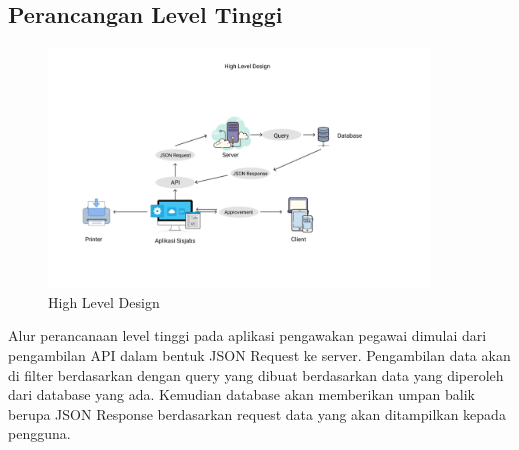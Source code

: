 \subsection{Perancangan Level Tinggi}

\begin{figure}
	\centering
	\includegraphics[width=0.9\textwidth]
	{pics/highleveldesign.png}
	\caption{High Level Design}
	\label{fig:34}
\end{figure}

Alur perancanaan level tinggi pada aplikasi pengawakan pegawai dimulai dari pengambilan API dalam bentuk JSON Request ke server. Pengambilan data akan di filter berdasarkan dengan query yang dibuat berdasarkan data yang diperoleh dari database yang ada. Kemudian database akan memberikan umpan balik berupa JSON Response berdasarkan request data yang akan ditampilkan kepada pengguna. 

